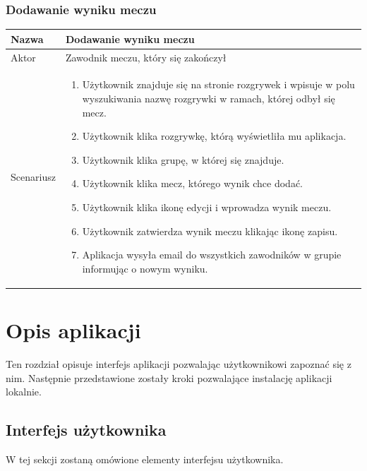 \documentclass[shortabstract]{iithesis}
\begin{document}
\subsection{Dodawanie wyniku meczu}
\begin{tabular}{|l|p{12cm}|}
    \hline
    Nazwa      & Dodawanie wyniku meczu                                                                                              \\
    \hline
    Aktor      & Zawodnik meczu, który się zakończył                                                                                 \\
    \hline
    Scenariusz &
    \begin{enumerate}[nosep,leftmargin=*,rightmargin=8pt,before=\vspace{-7.5pt},after=\vspace{-8pt}]
        \item Użytkownik znajduje się na stronie rozgrywek i wpisuje w polu wyszukiwania nazwę rozgrywki w ramach, której odbył się mecz.
        \item Użytkownik klika rozgrywkę, którą wyświetliła mu aplikacja.
        \item Użytkownik klika grupę, w której się znajduje.
        \item Użytkownik klika mecz, którego wynik chce dodać.
        \item Użytkownik klika ikonę edycji i wprowadza wynik meczu.
        \item Użytkownik zatwierdza wynik meczu klikając ikonę zapisu.
        \item Aplikacja wysyła email do wszystkich zawodników w grupie informując o nowym wyniku.
    \end{enumerate} \\
    \hline
\end{tabular}

\chapter{Opis aplikacji}
Ten rozdział opisuje interfejs aplikacji pozwalając użytkownikowi zapoznać się z nim. Następnie przedstawione zostały
kroki pozwalające instalację aplikacji lokalnie.
\section{Interfejs użytkownika}
W tej sekcji zostaną omówione elementy interfejsu użytkownika.
\end{document}
